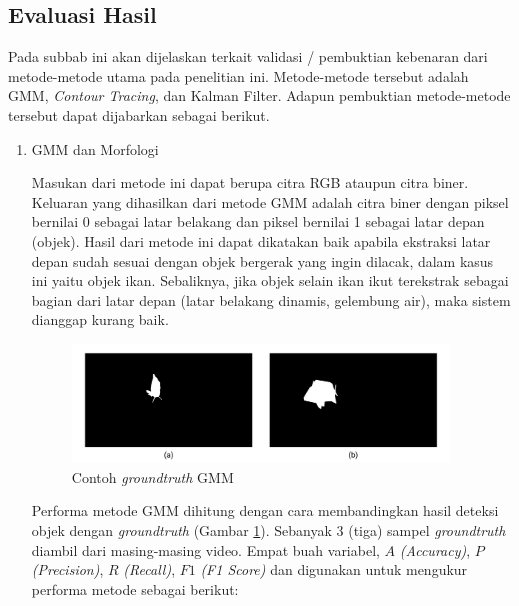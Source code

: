     \subsection{Evaluasi Hasil}
    Pada subbab ini akan dijelaskan terkait validasi / pembuktian kebenaran dari metode-metode utama pada penelitian ini. Metode-metode tersebut adalah GMM, \textit{Contour Tracing}, dan Kalman Filter. Adapun pembuktian metode-metode tersebut dapat dijabarkan sebagai berikut.
    
        \begin{enumerate}
            \item GMM dan Morfologi
            
            Masukan dari metode ini dapat berupa citra RGB ataupun citra biner. Keluaran yang dihasilkan dari metode GMM adalah citra biner dengan piksel bernilai 0 sebagai latar belakang dan piksel bernilai 1 sebagai latar depan (objek). Hasil dari metode ini dapat dikatakan baik apabila ekstraksi latar depan sudah sesuai dengan objek bergerak yang ingin dilacak, dalam kasus ini yaitu objek ikan. Sebaliknya, jika objek selain ikan ikut terekstrak sebagai bagian dari latar depan (latar belakang dinamis, gelembung air), maka sistem dianggap kurang baik.
            
            \begin{figure}[H]
            \centering
              \singlespacing
              \captionsetup{justification=centering,margin=0.5cm}
              \includegraphics[width=10cm]{image/gt1.jpg}
              \caption{Contoh \textit{groundtruth} GMM}
              \label{fig:gt1}
            \end{figure}
            
            Performa metode GMM dihitung dengan cara membandingkan hasil deteksi objek dengan \textit{groundtruth} (Gambar \ref{fig:gt1}). Sebanyak 3 (tiga) sampel \textit{groundtruth} diambil dari masing-masing video. Empat buah variabel, $A$ \textit{(Accuracy)}, $P$ \textit{(Precision)}, $R$ \textit{(Recall)}, $F1$ \textit{(F1 Score)} dan digunakan untuk mengukur performa metode sebagai berikut:
            

\end{enumerate}
